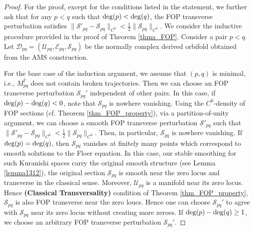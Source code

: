 \documentclass[reqno, 10pt]{amsart}
\numberwithin{equation}{section}
\numberwithin{equation}{section}
\theoremstyle{definition}
\theoremstyle{remark}
\newcommand{\mb}{\mathbb}
\newcommand{\mc}{\mathcal}
\begin{document}
\begin{proof}
For the proof, except for the conditions listed in the statement, we further ask that for any $p<q$ such that ${\rm deg}(p) < {\rm deg}(q)$, the FOP transverse perturbation satisfies $\| {\mc S}'_{pq} - {\mc S}_{pq} \|_{C^0} < \frac12 \| {\mc S}_{pq}\|_{C^0}$. We consider the inductive procedure provided in the proof of Theorem \ref{thma_FOP}. Consider a pair $p<q$. Let ${\mc D}_{pq} = ({\mc U}_{pq}, {\mc E}_{pq}, {\mc S}_{pq})$ be the normally complex derived orbifold obtained from the AMS construction.

For the base case of the induction argument, we assume that $(p, q)$ is  minimal, i.e., $M_{pq}^{\mb F}$ does not contain broken trajectories. Then we can choose an FOP transverse perturbation ${\mc S}_{pq}'$ independent of other pairs. In this case, if ${\rm deg}(p) - {\rm deg}(q) <0$, note that ${\mc S}_{pq}$ is nowhere vanishing. Using the $C^0$-density of FOP sections (cf. Theorem \ref{thm_FOP_property}), via a partition-of-unity argument, we can choose a smooth FOP transverse perturbation ${\mc S}'_{pq}$ such that $\| {\mc S}'_{pq} - {\mc S}_{pq} \|_{C^0} < \frac12 \| {\mc S}_{pq}\|_{C^0}$. Then, in particular, ${\mc S}_{pq}$ is nowhere vanishing. If ${\rm deg}(p) = {\rm deg}(q)$, then ${\mc S}_{pq}$ vanishes at finitely many points which correspond to smooth solutions to the Floer equation. In this case, our stable smoothing for such Kuranishi spaces carry the original smooth structure (see Lemma \ref{lemma1312}), the original section ${\mc S}_{pq}$ is smooth near the zero locus and transverse in the classical sense. Moreover, ${\mc U}_{pq}$ is a manifold near its zero locus. Hence {\bf (Classical Transversality)} condition of Theorem \ref{thm_FOP_property}, ${\mc S}_{pq}$ is also FOP transverse near the zero loucs. Hence one can choose ${\mc S}_{pq}'$ to agree with ${\mc S}_{pq}$ near its zero locus without creating more zeroes. If ${\rm deg}(p) - {\rm deg}(q) \geq 1$, we choose an arbitrary FOP transverse perturbation ${\mc S}_{pq}'$.  


\end{proof}
\end{document}
